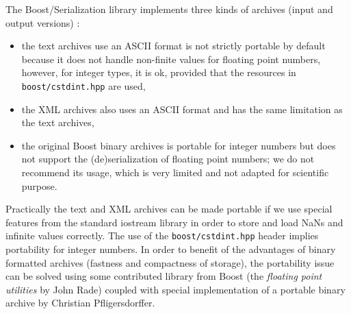 \documentclass[a4paper,12pt]{article}
\begin{document}
The  Boost/Serialization  library implements  three  kinds of  archives
(input and output versions) :
\begin{itemize}

\item the text archives use an  ASCII format is not strictly portable
by default because it does not handle non-finite values for
 floating point numbers, however, for integer types, it is ok,
provided that the resources in \texttt{boost/cstdint.hpp} are used,





\item the XML archives also uses an ASCII format and has the same
limitation as the text archives,

\item  the original  Boost  binary archives  is  portable for  integer
  numbers but does not support the (de)serialization of floating point
  numbers; we  do not recommend its  usage, which is  very limited and
  not adapted for scientific purpose.

\end{itemize}

Practically the text  and XML archives can be made  portable if we use
special features from the standard  iostream library in order to store
and  load  NaNs  and  infinite  values  correctly.   The  use  of  the
\texttt{boost/cstdint.hpp}  header  implies  portability  for  integer
numbers.  In  order to benefit  of the advantages of  binary formatted
archives (fastness and compactness  of storage), the portability issue
can  be  solved  using   some  contributed  library  from  Boost  (the
\emph{floating  point utilities}  by John  Rade) coupled  with special
implementation of a portable binary archive by Christian Pfligersdorffer.

\end{document}

